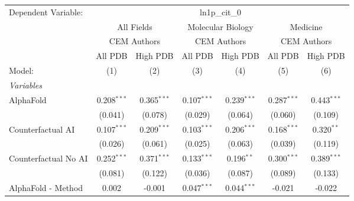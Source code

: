 \begingroup
\centering
\begin{tabular}{lcccccc}
   \tabularnewline \midrule \midrule
   Dependent Variable: & \multicolumn{6}{c}{ln1p\_cit\_0}\\
 & \multicolumn{2}{c}{All Fields} & \multicolumn{2}{c}{Molecular Biology} & \multicolumn{2}{c}{Medicine} \\
\cmidrule(lr){2-3} \cmidrule(lr){4-5} \cmidrule(lr){6-7}
 & \multicolumn{2}{c}{CEM Authors} & \multicolumn{2}{c}{CEM Authors} & \multicolumn{2}{c}{CEM Authors} \\
\cmidrule(lr){2-3} \cmidrule(lr){4-5} \cmidrule(lr){6-7}
 & \multicolumn{1}{c}{All PDB} & \multicolumn{1}{c}{High PDB} & \multicolumn{1}{c}{All PDB} & \multicolumn{1}{c}{High PDB} & \multicolumn{1}{c}{All PDB} & \multicolumn{1}{c}{High PDB} \\
\cmidrule(lr){2-2} \cmidrule(lr){3-3} \cmidrule(lr){4-4} \cmidrule(lr){5-5} \cmidrule(lr){6-6} \cmidrule(lr){7-7}
   Model:                                                     & (1)           & (2)           & (3)           & (4)           & (5)           & (6)\\  
   \midrule
   \emph{Variables}\\
   AlphaFold                                                  & 0.208$^{***}$ & 0.365$^{***}$ & 0.107$^{***}$ & 0.239$^{***}$ & 0.287$^{***}$ & 0.443$^{***}$\\   
                                                              & (0.041)       & (0.078)       & (0.029)       & (0.064)       & (0.060)       & (0.109)\\   
   Counterfactual AI                                          & 0.107$^{***}$ & 0.209$^{***}$ & 0.103$^{***}$ & 0.206$^{***}$ & 0.168$^{***}$ & 0.320$^{**}$\\   
                                                              & (0.026)       & (0.061)       & (0.025)       & (0.063)       & (0.039)       & (0.119)\\   
   Counterfactual No AI                                       & 0.252$^{***}$ & 0.371$^{***}$ & 0.133$^{***}$ & 0.196$^{**}$  & 0.300$^{***}$ & 0.389$^{***}$\\   
                                                              & (0.081)       & (0.122)       & (0.036)       & (0.087)       & (0.089)       & (0.133)\\   
   AlphaFold - Method                                         & 0.002         & -0.001        & 0.047$^{***}$ & 0.044$^{***}$ & -0.021        & -0.022\\   

\end{tabular}
